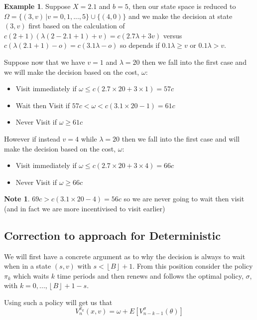 \documentclass[a4paper,10pt]{article}
\newcommand{\floor}[1]{\left \lfloor #1 \right \rfloor}
\theoremstyle{definition}
\theoremstyle{definition}
\newtheorem{example}[theorem]{Example}
\theoremstyle{remark}
\theoremstyle{definition}
\newtheorem*{note}{Note}
\begin{document}
\begin{example}
Suppose $X=2.1$ and $b=5$, then our state space is reduced to $\Omega= \{ (3,v) \, | v=0,1,...,5 \} \cup \{(4,0) \}$ and we make the decision at state $(3,v)$ first based on the calculation of $c(2+1)(\lambda(2-2.1+1)+v)=c(2.7\lambda+3v)$ versus $c(\lambda (2.1+1)-o)=c(3.1\lambda -o)$ so depends if $0.1 \lambda \geq v$ or $0.1 \lambda > v $.

Suppose now that we have $v=1$ and $\lambda=20$ then we fall into the first case and we will make the decision based on the cost, $\omega$:
\begin{itemize}
\item Visit immediately if $\omega \leq c(2.7 \times 20 + 3 \times 1)=57c$
\item Wait then Visit if $57c < \omega < c(3.1 \times 20 -1)=61c $
\item Never Visit if $\omega \geq 61c$
\end{itemize}

However if instead $v=4$ while $\lambda=20$ then we fall into the first case and will make the decision based on the cost, $\omega$:
\begin{itemize}
\item Visit immediately if $\omega \leq c(2.7 \times 20 +3 \times 4)=66c$
\item Never Visit if $\omega \geq 66c$
\end{itemize}

\begin{note}
$69c > c(3.1 \times 20 -4)=56c$ so we are never going to wait then visit (and in fact we are more incentivised to visit earlier)
\end{note} 
\end{example}

\subsection{Correction to approach for Deterministic}
We will first have a concrete argument as to why the decision is always to wait when in a state $(s,v)$ with $s < \floor{B}+1$. From this position consider the policy $\pi_{k}$ which waits $k$ time periods and then renews and follows the optimal policy, $\sigma$, with $k=0,...,\floor{B}+1-s$.

Using such a policy will get us that
\begin{equation}
V_{n}^{\pi_{k}}(x,v)=\omega + E[V_{n-k-1}^{\sigma}(\theta)]
\end{equation}
\end{document}
